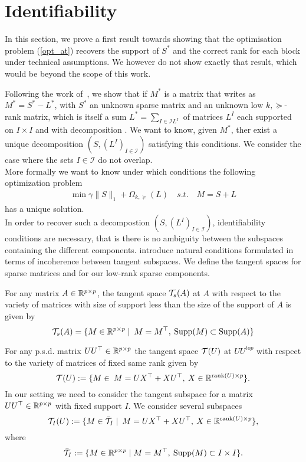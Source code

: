 \section{Identifiability}
\label{sec:id}

In this section, we prove a first result towards showing that the optimisation problem (\ref{opt_at}) recovers the support of $S^*$ and the correct rank for each block under technical assumptions. We however do not show exactly that result, which would be beyond the scope of this work. 

Following the work of~\citet{chandrasekaran2011rank}, we show that if  $M^{\ast}$ is a matrix that writes as  $M^{\ast}= S^{\ast}-L^{\ast}$, with $S^{\ast}$ an unknown sparse matrix and an unknown  low $k,\succeq$-rank matrix, which is itself a sum $L^{\ast}=\sum_{I\in\mathcal{I}L^{I}}$ of matrices $L^{I}$ each supported on $I \times I$ and with decomposition . We want to know, given $M^{\ast}$, ther exist a unique decomposition $\left(S,(L^{I})_{I\in\mathcal{I}}\right)$ satisfying this conditions. We consider the case where the sets $I\in\mathcal{I}$ do not overlap.  \\

More formally we want to know under which conditions the following optimization problem 
\begin{align}
\min \gamma\|S\|_1+\Omega_{k,\succeq}(L) \quad s.t. \quad M=S+L
\end{align}
has a unique solution.\\

In order to recover such a decompostion  $\left(S,(L^{I})_{I\in\mathcal{I}}\right)$, identifiability conditions are necessary, that is there is no ambiguity between the subspaces containing the different components.  \citet{chandrasekaran2011rank} introduce natural conditions formulated in terms of incoherence between tangent subspaces. We define the tangent spaces for sparse matrices and for our low-rank sparse components.

For any matrix $A\in\mathbb{R}^{p\times p}$, the tangent space $\mathcal{T}_s(A)$ at $A$ with respect to the variety of matrices with size of support less than the size of the support of $A$ is given by
$$
\mathcal{T}_s(A)=\{M \in \mathbb{R}^{p \times p}\mid  \: M=M^\top, \: {\rm Supp}(M)\subset {\rm Supp}(A)\}
$$

For any p.s.d. matrix $UU^{\top}\in\mathbb{R}^{p\times p}$  the tangent space $\mathcal{T}(U)$ at $UU^{top}$ with respect to the variety of matrices of fixed same rank given by
$$
\mathcal{T}(U):=\{M \in \: M=UX^\top+XU^\top,\: X \in \mathbb{R}^{\text{rank}(U) \times p} \}.
$$
In our setting we need to consider the tangent subspace for a matrix $UU^{\top}\in\mathbb{R}^{p\times p}$ with fixed support $I$.
We consider several subspaces
$$\mathcal{T}_I(U):=\{M \in \bar{\mathcal{T}}_I\mid \: M=UX^\top+XU^\top,\: X \in \mathbb{R}^{\text{rank}(U) \times p} \},$$
where 
$$
\bar{\mathcal{T}}_I:=\{M \in \mathbb{R}^{p \times p}\mid  M=M^\top, \: {\rm Supp}(M)\subset I \times I\}.
$$

